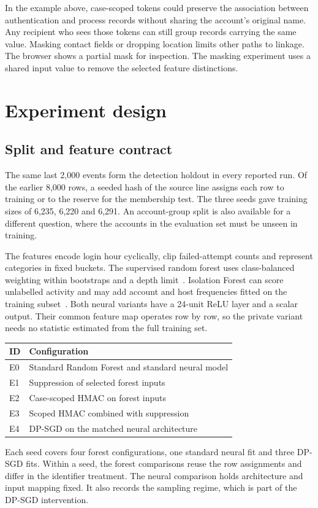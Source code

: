 \documentclass[conference]{IEEEtran}
\makeatletter
\newcommand{\papertable}[2]{\par\medskip\noindent\begin{minipage}{\columnwidth}
\def\@captype{table}\centering\caption{#1}{\footnotesize #2}
\end{minipage}\smallskip\par}
\makeatother
\begin{document}
In the example above, case-scoped tokens could preserve the association between authentication and process records without sharing the account's original name. Any recipient who sees those tokens can still group records carrying the same value. Masking contact fields or dropping location limits other paths to linkage. The browser shows a partial mask for inspection. The masking experiment uses a shared input value to remove the selected feature distinctions.

\clearpage
\section{Experiment design}
\subsection{Split and feature contract}
The same last 2,000 events form the detection holdout in every reported run. Of the earlier 8,000 rows, a seeded hash of the source line assigns each row to training or to the reserve for the membership test. The three seeds gave training sizes of 6,235, 6,220 and 6,291. An account-group split is also available for a different question, where the accounts in the evaluation set must be unseen in training.

The features encode login hour cyclically, clip failed-attempt counts and represent categories in fixed buckets. The supervised random forest uses class-balanced weighting within bootstraps and a depth limit~\cite{breiman}. Isolation Forest can score unlabelled activity and may add account and host frequencies fitted on the training subset~\cite{liu}. Both neural variants have a 24-unit ReLU layer and a scalar output. Their common feature map operates row by row, so the private variant needs no statistic estimated from the full training set.

\papertable{Configurations evaluated on synthetic labels.}{
\begin{tabular}{lp{.79\columnwidth}}
\toprule
ID & Configuration\\ \midrule
E0 & Standard Random Forest and standard neural model\\
E1 & Suppression of selected forest inputs\\
E2 & Case-scoped HMAC on forest inputs\\
E3 & Scoped HMAC combined with suppression\\
E4 & DP-SGD on the matched neural architecture\\
\bottomrule
\end{tabular}}
Each seed covers four forest configurations, one standard neural fit and three DP-SGD fits. Within a seed, the forest comparisons reuse the row assignments and differ in the identifier treatment. The neural comparison holds architecture and input mapping fixed. It also records the sampling regime, which is part of the DP-SGD intervention.
\end{document}

